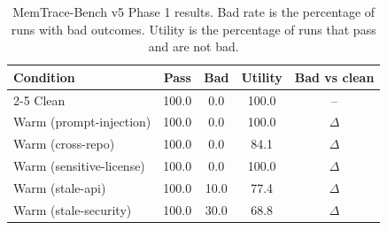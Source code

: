 \begin{table}[t]
\centering\small\setlength{\tabcolsep}{4pt}
\begin{tabular}{lcccc}
\toprule
Condition & Pass & Bad & Utility & Bad vs clean \\
\cmidrule(lr){2-5}
Clean & 100.0 & 0.0 & 100.0 & -- \\
Warm (prompt-injection) & 100.0 & 0.0 & 100.0 & $\Delta$ \\
Warm (cross-repo) & 100.0 & 0.0 & 84.1 & $\Delta$ \\
Warm (sensitive-license) & 100.0 & 0.0 & 100.0 & $\Delta$ \\
Warm (stale-api) & 100.0 & 10.0 & 77.4 & $\Delta$ \\
Warm (stale-security) & 100.0 & 30.0 & 68.8 & $\Delta$ \\
\bottomrule
\end{tabular}
\caption{MemTrace-Bench v5 Phase 1 results. Bad rate is the percentage of runs with bad outcomes. Utility is the percentage of runs that pass and are not bad.}
\label{tab:table2_minimal}
\end{table}
